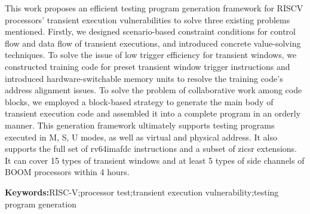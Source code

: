 This work proposes an efficient testing program generation framework for RISCV processors' transient execution vulnerabilities
to solve three existing problems mentioned.
Firstly, we designed scenario-based constraint conditions for control flow and data flow of transient executions, 
and introduced concrete value-solving techniques.
To solve the issue of low trigger efficiency for transient windows, 
we constructed training code for preset transient window trigger instructions 
and introduced hardware-switchable memory units 
to resolve the training code's address alignment issues.
To solve the problem of collaborative work among code blocks, 
we employed a block-based strategy to generate the main body of transient execution code 
and assembled it into a complete program in an orderly manner.
This generation framework ultimately supports testing programs executed in M, S, U modes, 
as well as virtual and physical address. 
It also supports the full set of rv64imafdc instructions and a subset of zicsr extensions. 
It can cover 15 types of transient windows and at least 5 types of side channels of BOOM processors within 4 hours.\par

\textbf{Keywords:}RISC-V;processor test;transient execution vulnerability;testing program generation


